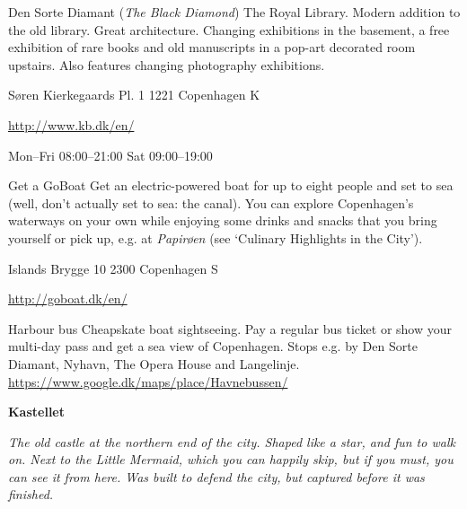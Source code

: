\begin{funitem}
{Den Sorte Diamant (\textit{The Black Diamond})}
{The Royal Library. Modern addition to the old library. Great architecture. Changing exhibitions in the basement, a free exhibition of rare books and old manuscripts in a pop-art decorated room upstairs. Also features changing photography exhibitions.}
{\begin{addr}
{Søren Kierkegaards Pl. 1}
{1221 Copenhagen K}
\end{addr}}
{\url{http://www.kb.dk/en/}}
{\begin{ohours}
{Mon–Fri}
{08:00–21:00}
{Sat}
{09:00–19:00}
{}
{}
{}
{}
\end{ohours}}
\end{funitem}
\begin{funitem}
{Get a GoBoat}
{Get an electric-powered boat for up to eight people and set to sea (well, don’t actually set to sea: the canal). You can explore Copenhagen’s waterways on your own while enjoying some drinks and snacks that you bring yourself or pick up, e.g. at \textit{Papirøen} (see `Culinary Highlights in the City').}
{\begin{addr}
{Islands Brygge 10}
{2300 Copenhagen S}
\end{addr}}
{\url{http://goboat.dk/en/}}
{\begin{ohours}
{}
{}
{}
{}
{}
{}
{}
{}
\end{ohours}}
\end{funitem}
\begin{funitemshort}
{Harbour bus}
{Cheapskate boat sightseeing. Pay a regular bus ticket or show your multi-day pass  and get a sea view of Copenhagen. Stops e.g. by Den Sorte Diamant, Nyhavn, The Opera House and Langelinje.}
{\url{https://www.google.dk/maps/place/Havnebussen/ }}
\end{funitemshort}
\noindent\textbf{Kastellet}
\par\noindent\emph{The old castle at the northern end of the city. Shaped like a star, and fun to walk on. Next to the Little Mermaid, which you can happily skip, but if you must, you can see it from here. Was built to defend the city, but captured before it was finished.}
\medskip

